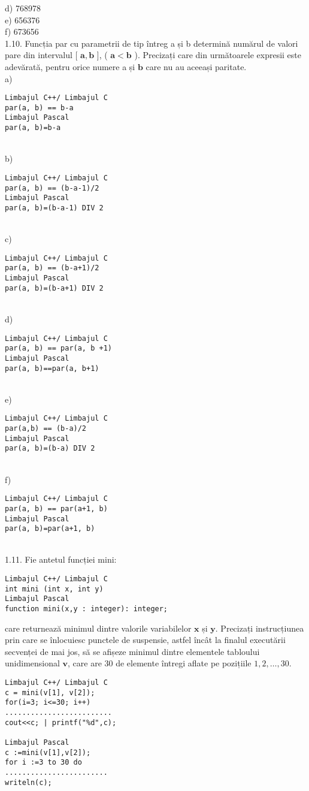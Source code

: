 d) 768978
\\
e) 656376
\\
f) 673656
\\
1.10. Funcția par cu parametrii de tip întreg a și b determină numărul de valori pare din intervalul [ $\mathbf{a}, \mathbf{b}$ ], ( $\mathbf{a}<\mathbf{b}$ ). Precizați care din următoarele expresii este adevărată, pentru orice numere a și $\mathbf{b}$ care nu au aceeași paritate.
\\
a) \begin{verbatim}
Limbajul C++/ Limbajul C
par(a, b) == b-a
Limbajul Pascal
par(a, b)=b-a
\end{verbatim}
\\
b) \begin{verbatim}
Limbajul C++/ Limbajul C
par(a, b) == (b-a-1)/2
Limbajul Pascal
par(a, b)=(b-a-1) DIV 2
\end{verbatim}
\\
c) \begin{verbatim}
Limbajul C++/ Limbajul C
par(a, b) == (b-a+1)/2
Limbajul Pascal
par(a, b)=(b-a+1) DIV 2
\end{verbatim}
\\
d) \begin{verbatim}
Limbajul C++/ Limbajul C
par(a, b) == par(a, b +1)
Limbajul Pascal
par(a, b)==par(a, b+1)
\end{verbatim}
\\
e) \begin{verbatim}
Limbajul C++/ Limbajul C
par(a,b) == (b-a)/2
Limbajul Pascal
par(a, b)=(b-a) DIV 2
\end{verbatim}
\\
f) \begin{verbatim}
Limbajul C++/ Limbajul C
par(a, b) == par(a+1, b)
Limbajul Pascal
par(a, b)=par(a+1, b)
\end{verbatim}
\\
1.11. Fie antetul funcției mini:
\begin{verbatim}
Limbajul C++/ Limbajul C
int mini (int x, int y)
Limbajul Pascal
function mini(x,y : integer): integer;
\end{verbatim}
care returnează minimul dintre valorile variabilelor $\mathbf{x}$ și $\mathbf{y}$. Precizați instrucțiunea prin care se înlocuiesc punctele de suspensie, astfel încât la finalul executării secvenței de mai jos, să se afișeze minimul dintre elementele tabloului unidimensional $\mathbf{v}$, care are 30 de elemente întregi aflate pe pozițiile $1,2, \ldots, 30$.
\begin{verbatim}
Limbajul C++/ Limbajul C
c = mini(v[1], v[2]);
for(i=3; i<=30; i++)
.........................
cout<<c; | printf("%d",c);

Limbajul Pascal
c :=mini(v[1],v[2]);
for i :=3 to 30 do
........................
writeln(c);
\end{verbatim}
